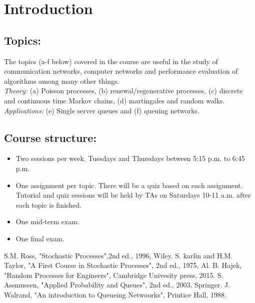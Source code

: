 \documentclass[all-lectures.tex]{subfiles}
\begin{document}
\onlyinsubfile{\maketitle}
\chapter*{Introduction}
\section*{Topics:} 
The topics (a-f below) covered in the course are useful in the study of communication networks, computer networks and performance evaluation of algorithms among many other things. \\

\textit{Theory:} (a) Poisson processes, (b) renewal/regenerative processes, (c) discrete and continuous time Markov chains, (d) martingales and random walks. \\
\indent \textit{Applications:} (e) Single server  queues and (f) queuing networks. \\
\section*{Course structure:}
\begin{itemize}
\item Two sessions per week. Tuesdays and Thursdays between 5:15 p.m. to 6:45 p.m.
\item One assignment per topic. There will be a quiz based on each assignment. Tutorial and quiz sessions will be held by TAs on Saturdays 10-11 a.m. after each topic is finished.
\item One mid-term exam.
\item One final exam.
\end{itemize}

\begin{thebibliography}{1}
\bibitem{} S.M. Ross, "Stochastic Processes",2nd ed., 1996, Wiley.
\bibitem{} S. karlin and H.M. Taylor, "A First Course in Stochastic Processes", 2nd ed., 1975, Al. 
\bibitem{} B. Hajek, "Random Processes for Engineers", Cambridge Univesity press, 2015.
\bibitem{} S. Assmussen, "Applied Probability and Queues", 2nd ed., 2003, Springer. 
\bibitem{} J. Walrand, "An introduction to Queueing Netwoorks", Printice Hall, 1988.
\end{thebibliography}
\end{document}
